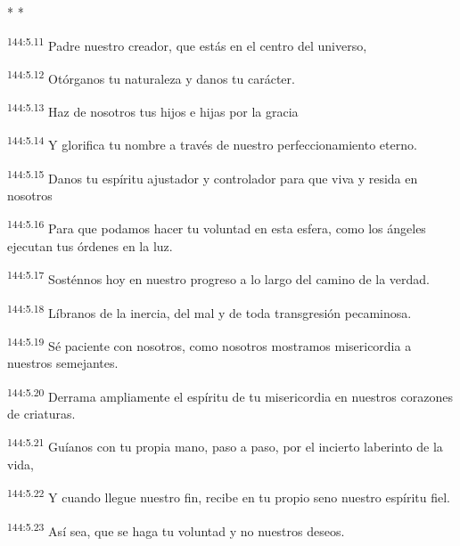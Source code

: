 \begin{center}
	\par * * *
\end{center}

\begin{center}
\par 
\textsuperscript{144:5.11} Padre nuestro creador, que estás en el centro del universo,

\par 
\textsuperscript{144:5.12} Otórganos tu naturaleza y danos tu carácter.

\par 
\textsuperscript{144:5.13} Haz de nosotros tus hijos e hijas por la gracia

\par 
\textsuperscript{144:5.14} Y glorifica tu nombre a través de nuestro perfeccionamiento eterno.

\par 
\textsuperscript{144:5.15} Danos tu espíritu ajustador y controlador para que viva y resida en nosotros

\par 
\textsuperscript{144:5.16} Para que podamos hacer tu voluntad en esta esfera, como los ángeles ejecutan tus órdenes en la luz.

\par 
\textsuperscript{144:5.17} Sosténnos hoy en nuestro progreso a lo largo del camino de la verdad.

\par 
\textsuperscript{144:5.18} Líbranos de la inercia, del mal y de toda transgresión pecaminosa.

\par 
\textsuperscript{144:5.19} Sé paciente con nosotros, como nosotros mostramos misericordia a nuestros semejantes.

\par 
\textsuperscript{144:5.20} Derrama ampliamente el espíritu de tu misericordia en nuestros corazones de criaturas.

\par 
\textsuperscript{144:5.21} Guíanos con tu propia mano, paso a paso, por el incierto laberinto de la vida,

\par 
\textsuperscript{144:5.22} Y cuando llegue nuestro fin, recibe en tu propio seno nuestro espíritu fiel.

\par 
\textsuperscript{144:5.23} Así sea, que se haga tu voluntad y no nuestros deseos.
\end{center}

